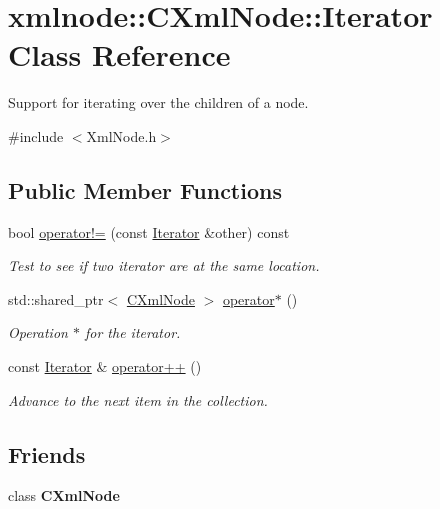 \hypertarget{classxmlnode_1_1_c_xml_node_1_1_iterator}{\section{xmlnode\+:\+:C\+Xml\+Node\+:\+:Iterator Class Reference}
\label{classxmlnode_1_1_c_xml_node_1_1_iterator}
}


Support for iterating over the children of a node.  




{\ttfamily \#include $<$Xml\+Node.\+h$>$}

\subsection*{Public Member Functions}
\begin{DoxyCompactItemize}
\item 
bool \hyperlink{classxmlnode_1_1_c_xml_node_1_1_iterator_a9907b45ce49352e0d5ffafa7f2c4a520}{operator!=} (const \hyperlink{classxmlnode_1_1_c_xml_node_1_1_iterator}{Iterator} \&other) const 
\begin{DoxyCompactList}\small\item\em Test to see if two iterator are at the same location. \end{DoxyCompactList}\item 
std\+::shared\+\_\+ptr$<$ \hyperlink{classxmlnode_1_1_c_xml_node}{C\+Xml\+Node} $>$ \hyperlink{classxmlnode_1_1_c_xml_node_1_1_iterator_a6d255a513c60c7de55a01c5eb626bf6d}{operator$\ast$} ()
\begin{DoxyCompactList}\small\item\em Operation $\ast$ for the iterator. \end{DoxyCompactList}\item 
const \hyperlink{classxmlnode_1_1_c_xml_node_1_1_iterator}{Iterator} \& \hyperlink{classxmlnode_1_1_c_xml_node_1_1_iterator_aefa7392f7c198dcf907d8458fbf0db1a}{operator++} ()
\begin{DoxyCompactList}\small\item\em Advance to the next item in the collection. \end{DoxyCompactList}\end{DoxyCompactItemize}
\subsection*{Friends}
\begin{DoxyCompactItemize}
\item 
\hypertarget{classxmlnode_1_1_c_xml_node_1_1_iterator_a770307dc9d4e2e7005bcf200bae3066a}{class {\bfseries C\+Xml\+Node}}\label{classxmlnode_1_1_c_xml_node_1_1_iterator_a770307dc9d4e2e7005bcf200bae3066a}

\end{DoxyCompactItemize}


